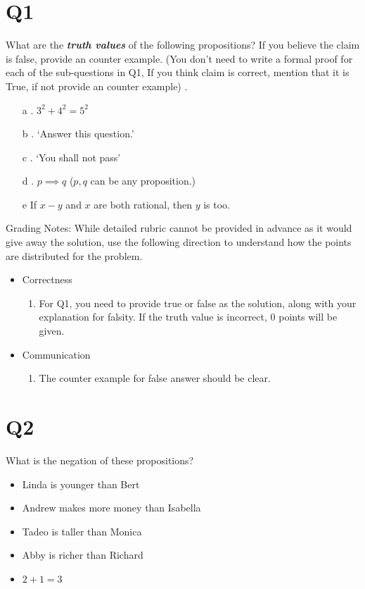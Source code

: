 \documentclass[12pt]{exam}
\begin{document}
\section{Q1}
What are the \textbf{\textit{truth values}} of the following propositions? If you believe the claim is false, provide an counter example. (You don't need to write a formal proof for each of the sub-questions in Q1, If you think claim is correct, mention that it is True, if not provide an counter example) .
\begin{enumerate}
    \item [a]. $3^2 + 4^2 = 5^2$
    \item [b]. `Answer this question.'
    \item [c]. `You shall not pass'
    \item [d]. $p \implies q$ ($p,q$ can be any proposition.)
    \item [e] If $x-y$ and $x$ are both rational, then $y$ is too.
\end{enumerate}

Grading Notes:
While detailed rubric cannot be provided in advance as it would give away the solution, use the following direction to understand how the points are distributed for the problem.
\begin{itemize}
    \item Correctness
    \begin{enumerate}
        \item For Q1, you need to provide true or false as the solution, along with your explanation for falsity. If the truth value is incorrect, 0 points will be given.
    \end{enumerate}
        
    \item Communication 
        \begin{enumerate}
            \item The counter example for false answer should be clear.
        \end{enumerate}
\end{itemize}


\section{Q2}
What is the negation of these propositions?
\begin{itemize}
    \item Linda is younger than Bert
    \item Andrew makes more money than Isabella
    \item Tadeo is taller than Monica
    \item Abby is richer than Richard
    \item \(2 + 1 = 3\)
\end{itemize}
\end{document}
